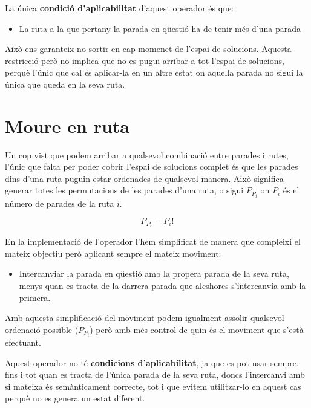 La única \textbf{condició d'aplicabilitat} d'aquest operador és que:

\begin{itemize}
	\item La ruta a la que pertany la parada en qüestió ha de tenir més d'una parada
\end{itemize}

Això ens garanteix no sortir en cap momenet de l'espai de solucions. Aquesta restricció però no implica que no es pugui arribar a tot l'espai de solucions, perquè l'únic que cal és aplicar-la en un altre estat on aquella parada no sigui la única que queda en la seva ruta.



\section{Moure en ruta} %
\label{sec:moure_en_ruta}

Un cop vist que podem arribar a qualsevol combinació entre parades i rutes, l'únic que falta per poder cobrir l'espai de solucions complet és que les parades dins d'una ruta puguin estar ordenades de qualsevol manera. Això significa generar totes les permutacions de les parades d'una ruta, o sigui $P_{P_i}$ on $P_i$ és el número de parades de la ruta $i$.

\[
	P_{P_i} = P_i!
\]

En la implementació de l'operador l'hem simplificat de manera que compleixi el mateix objectiu però aplicant sempre el mateix moviment:
\begin{itemize}
	\item Intercanviar la parada en qüestió amb la propera parada de la seva ruta, menys quan es tracta de la darrera parada que aleshores s'intercanvia amb la primera.
\end{itemize}

Amb aquesta simplificació del moviment podem igualment assolir qualsevol ordenació possible ($P_{P_i}$) però amb més control de quin és el moviment que s'està efectuant.

Aquest operador no té \textbf{condicions d'aplicabilitat}, ja que es pot usar sempre, fins i tot quan es tracta de l'única parada de la seva ruta, doncs l'intercanvi amb si mateixa és semànticament correcte, tot i que evitem utilitzar-lo en aquest cas perquè no es genera un estat diferent.


